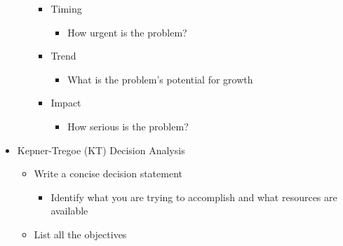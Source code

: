 \begin{itemize}
\begin{itemize}
        \begin{itemize}

          \item Timing

            \begin{itemize}

              \item How urgent is the problem?

            \end{itemize}

          \item Trend

            \begin{itemize}

              \item What is the problem's potential for growth

            \end{itemize}

          \item Impact

            \begin{itemize}

              \item How serious is the problem?

            \end{itemize}

        \end{itemize}

    \end{itemize}

  \item Kepner-Tregoe (KT) Decision Analysis

    \begin{itemize}

      \item Write a concise decision statement

        \begin{itemize}

          \item Identify what you are trying to accomplish and what resources are available

        \end{itemize}

      \item List all the objectives

        \begin{itemize}


\end{itemize}
\end{itemize}
\end{itemize}
